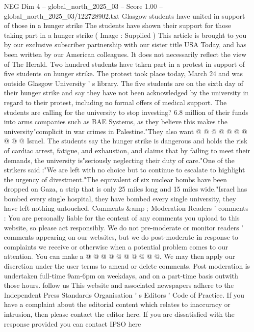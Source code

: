 \begin{textsample}{NEG Dim 4 – global\_north\_2025\_03 – Score 1.00 – global\_north\_2025\_03/122728902.txt}  \label{ex:f4_neg_398}
Glasgow students have united in support of those in a hunger strike The students have shown their support for those taking part in a hunger strike ( Image : Supplied ) This article is brought to you by our exclusive subscriber partnership with our sister title USA Today, and has been written by our American colleagues.
It does not necessarily reflect the view of The Herald.
Two hundred students have taken part in a protest in support of five students on hunger strike.
The protest took place today, March 24 and was outside Glasgow University ' s library.
The five students are on the sixth day of their hunger strike and say they have not been acknowledged by the university in regard to their protest, including no formal offers of medical support.
The students are calling for the university to stop investing? 6.8 million of their funds into arms companies such as BAE Systems, as they believe this makes the university"complicit in war crimes in Palestine."They also want @ @ @ @ @ @ @ @ @ @ Israel.
The students say the hunger strike is dangerous and holds the risk of cardiac arrest, fatigue, and exhaustion, and claims that by failing to meet their demands, the university is"seriously neglecting their duty of care."One of the strikers said :"We are left with no choice but to continue to escalate to highlight the urgency of divestment."The equivalent of six nuclear bombs have been dropped on Gaza, a strip that is only 25 miles long and 15 miles wide."Israel has bombed every single hospital, they have bombed every single university, they have left nothing untouched.
Comments \&amp ; Moderation Readers ' comments : You are personally liable for the content of any comments you upload to this website, so please act responsibly.
We do not pre-moderate or monitor readers ' comments appearing on our websites, but we do post-moderate in response to complaints we receive or otherwise when a potential problem comes to our attention.
You can make a @ @ @ @ @ @ @ @ @ @.
We may then apply our discretion under the user terms to amend or delete comments.
Post moderation is undertaken full-time 9am-6pm on weekdays, and on a part-time basis outwith those hours. follow us This website and associated newspapers adhere to the Independent Press Standards Organisation ' s Editors ' Code of Practice.
If you have a complaint about the editorial content which relates to inaccuracy or intrusion, then please contact the editor here.
If you are dissatisfied with the response provided you can contact IPSO here

\end{textsample}
